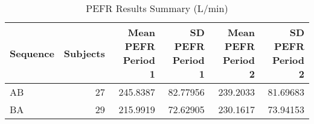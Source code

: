 \begin{table}
\centering
\caption{PEFR Results Summary (L/min)}
\centering
\begin{tabular}[t]{l|r|r|r|r|r}
\hline
Sequence & Subjects & Mean PEFR Period 1 & SD PEFR Period 1 & Mean PEFR Period 2 & SD PEFR Period 2\\
\hline
AB & 27 & 245.8387 & 82.77956 & 239.2033 & 81.69683\\
\hline
BA & 29 & 215.9919 & 72.62905 & 230.1617 & 73.94153\\
\hline
\end{tabular}
\label{summaryTable}
\end{table}
